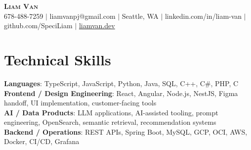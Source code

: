 \documentclass[letterpaper,11pt]{article}
\begin{document}

%
\begin{center}
    \textbf{\Huge \scshape Liam Van} \\ \vspace{1pt}
    \small 678-488-7259 $|$ \small {liamvanpj@gmail.com} $|$ Seattle, WA
 {{$|$ linkedin.com/in/liam-van} {$|$ github.com/SpeciLiam} {$|$ \href{https://liamvan.dev}{liamvan.dev}}}

\end{center}

\section{Technical Skills}
 \begin{itemize}[leftmargin=0.15in, label={}]
    \small{\item{
     \textbf{Languages}{: TypeScript, JavaScript, Python, Java, SQL, C++, C\#, PHP, C} \\
     \textbf{Frontend / Design Engineering}{: React, Angular, Node.js, NestJS, Figma handoff, UI implementation, customer-facing tools} \\
     \textbf{AI / Data Products}{: LLM applications, AI-assisted tooling, prompt engineering, OpenSearch, semantic retrieval, recommendation systems} \\
     \textbf{Backend / Operations}{: REST APIs, Spring Boot, MySQL, GCP, OCI, AWS, Docker, CI/CD, Grafana} \\
    }}
 \end{itemize}
%
\end{document}
